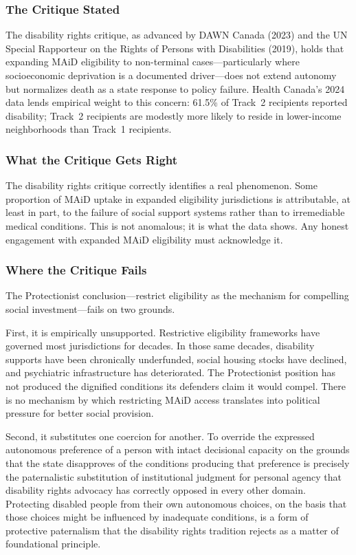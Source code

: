 \documentclass[11pt, letterpaper]{article}
\begin{document}
\subsubsection{The Critique Stated}

The disability rights critique, as advanced by DAWN Canada (2023) and the UN Special
Rapporteur on the Rights of Persons with Disabilities (2019), holds that expanding
MAiD eligibility to non-terminal cases---particularly where socioeconomic deprivation
is a documented driver---does not extend autonomy but normalizes death as a state
response to policy failure. Health Canada's 2024 data lends empirical weight to this
concern: 61.5\% of Track~2 recipients reported disability; Track~2 recipients are
modestly more likely to reside in lower-income neighborhoods than Track~1 recipients.

\subsubsection{What the Critique Gets Right}

The disability rights critique correctly identifies a real phenomenon. Some proportion
of MAiD uptake in expanded eligibility jurisdictions is attributable, at least in part,
to the failure of social support systems rather than to irremediable medical conditions.
This is not anomalous; it is what the data shows. Any honest engagement with expanded
MAiD eligibility must acknowledge it.

\subsubsection{Where the Critique Fails}

The Protectionist conclusion---restrict eligibility as the mechanism for compelling
social investment---fails on two grounds.

First, it is empirically unsupported. Restrictive eligibility frameworks have governed
most jurisdictions for decades. In those same decades, disability supports have been
chronically underfunded, social housing stocks have declined, and psychiatric
infrastructure has deteriorated. The Protectionist position has not produced the
dignified conditions its defenders claim it would compel. There is no mechanism by
which restricting MAiD access translates into political pressure for better social
provision.

Second, it substitutes one coercion for another. To override the expressed autonomous
preference of a person with intact decisional capacity on the grounds that the state
disapproves of the conditions producing that preference is precisely the paternalistic
substitution of institutional judgment for personal agency that disability rights
advocacy has correctly opposed in every other domain. Protecting disabled people from
their own autonomous choices, on the basis that those choices might be influenced by
inadequate conditions, is a form of protective paternalism that the disability rights
tradition rejects as a matter of foundational principle.
\end{document}

